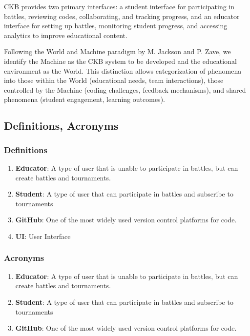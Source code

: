 CKB provides two primary interfaces: a student interface for participating in battles, reviewing codes, collaborating, and tracking progress, and an educator interface for setting up battles, monitoring student progress, and accessing analytics to improve educational content.

Following the World and Machine paradigm by M. Jackson and P. Zave, we identify the Machine as the CKB system to be developed and the educational environment as the World. This distinction allows categorization of phenomena into those within the World (educational needs, team interactions), those controlled by the Machine (coding challenges, feedback mechanisms), and shared phenomena (student engagement, learning outcomes).


\subsection{Definitions, Acronyms}
\subsubsection{Definitions}
\begin{enumerate}
    \item \textbf{Educator}: A type of user that is unable to participate in battles, but can create battles and tournaments.  
    \item \textbf{Student}: A type of user that  can participate in battles and subscribe to tournaments
    \item \textbf{GitHub}: One of the most widely used version control platforms for code. 
    \item \textbf{UI}: User Interface
\end{enumerate}

\subsubsection{Acronyms}
\begin{enumerate}
    \item \textbf{Educator}: A type of user that is unable to participate in battles, but can create battles and tournaments.  
    \item \textbf{Student}: A type of user that  can participate in battles and subscribe to tournaments
    \item \textbf{GitHub}: One of the most widely used version control platforms for code. 
\end{enumerate}


